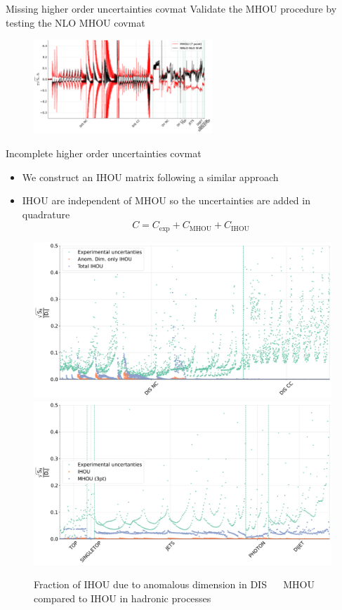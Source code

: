 \documentclass[aspectratio=169, 9pt,t]{beamer}
\begin{document}
\begin{frame}{Missing higher order uncertainties covmat}
  Validate the MHOU procedure by testing the NLO MHOU covmat
  \begin{figure}[!t]
    \centering
      \includegraphics[width=0.6\textwidth]{figures/shift_validation.pdf}
  \end{figure}
\end{frame}

\begin{frame}{Incomplete higher order uncertainties covmat}
  \begin{itemize}
    \item We construct an IHOU matrix following a similar approach
    \item IHOU are independent of MHOU so the uncertainties are added in quadrature
    $$C = C_\mathrm{exp}+C_\mathrm{MHOU}+C_\mathrm{IHOU}$$
  \end{itemize}
  \begin{figure}[!t]
    \centering
    \includegraphics[width=.48\textwidth]{figures/diag_cov_dis_ihou.pdf}
    \includegraphics[width=.48\textwidth]{figures/diag_cov_jets_top_ihou_3pt_mhou.pdf}
    \caption*{Fraction of IHOU due to anomalous dimension in DIS $\quad$ MHOU compared to IHOU in hadronic processes}
  \end{figure}
\end{frame}
\end{document}
